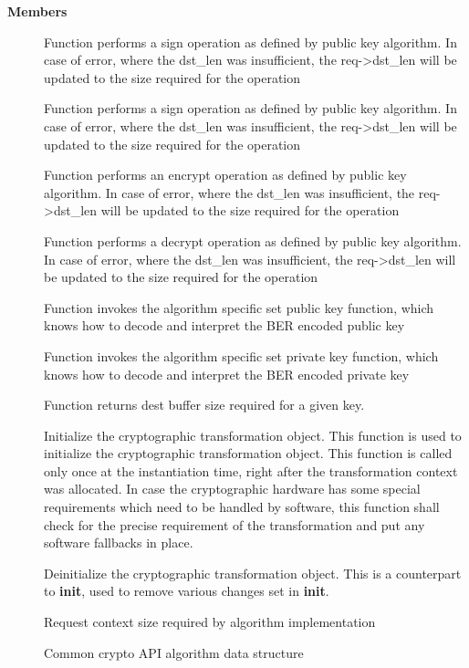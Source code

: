 \documentclass[a4paper,8pt,english]{sphinxmanual}
\begin{document}
\textbf{Members}
\begin{description}
\item[{}] \leavevmode
Function performs a sign operation as defined by public key
algorithm. In case of error, where the dst\_len was insufficient,
the req-\textgreater{}dst\_len will be updated to the size required for the
operation

\item[{}] \leavevmode
Function performs a sign operation as defined by public key
algorithm. In case of error, where the dst\_len was insufficient,
the req-\textgreater{}dst\_len will be updated to the size required for the
operation

\item[{}] \leavevmode
Function performs an encrypt operation as defined by public key
algorithm. In case of error, where the dst\_len was insufficient,
the req-\textgreater{}dst\_len will be updated to the size required for the
operation

\item[{}] \leavevmode
Function performs a decrypt operation as defined by public key
algorithm. In case of error, where the dst\_len was insufficient,
the req-\textgreater{}dst\_len will be updated to the size required for the
operation

\item[{}] \leavevmode
Function invokes the algorithm specific set public key
function, which knows how to decode and interpret
the BER encoded public key

\item[{}] \leavevmode
Function invokes the algorithm specific set private key
function, which knows how to decode and interpret
the BER encoded private key

\item[{}] \leavevmode
Function returns dest buffer size required for a given key.

\item[{}] \leavevmode
Initialize the cryptographic transformation object.
This function is used to initialize the cryptographic
transformation object. This function is called only once at
the instantiation time, right after the transformation context
was allocated. In case the cryptographic hardware has some
special requirements which need to be handled by software, this
function shall check for the precise requirement of the
transformation and put any software fallbacks in place.

\item[{}] \leavevmode
Deinitialize the cryptographic transformation object. This is a
counterpart to \textbf{init}, used to remove various changes set in
\textbf{init}.

\item[{}] \leavevmode
Request context size required by algorithm implementation

\item[{}] \leavevmode
Common crypto API algorithm data structure

\end{description}
\end{document}
